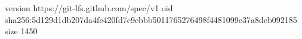 version https://git-lfs.github.com/spec/v1
oid sha256:5d129d1db207da4fe420fd7c9cbbb5011765276498f4481099e37a8deb092185
size 1450
